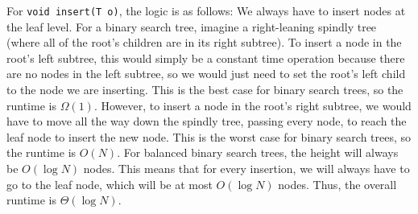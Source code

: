 \begin{blocksection}
\begin{solution}
For \lstinline$void insert(T o)$, the logic is as follows:
We always have to insert nodes at the leaf level.  For a binary search tree, imagine a right-leaning spindly tree (where all of the root's children are in its right subtree).  To insert a node in the root's left subtree, this would simply be a constant time operation because there are no nodes in the left subtree, so we would just need to set the root's left child to the node we are inserting.  This is the best case for binary search trees, so the runtime is $\Omega(1)$.  However, to insert a node in the root's right subtree, we would have to move all the way down the spindly tree, passing every node, to reach the leaf node to insert the new node.  This is the worst case for binary search trees, so the runtime is $O(N)$.  For balanced binary search trees, the height will always be $O(\log N)$ nodes.  This means that for every insertion, we will always have to go to the leaf node, which will be at most $O(\log N)$ nodes.  Thus, the overall runtime is $\Theta(\log N)$.

\end{solution}
\end{blocksection}
